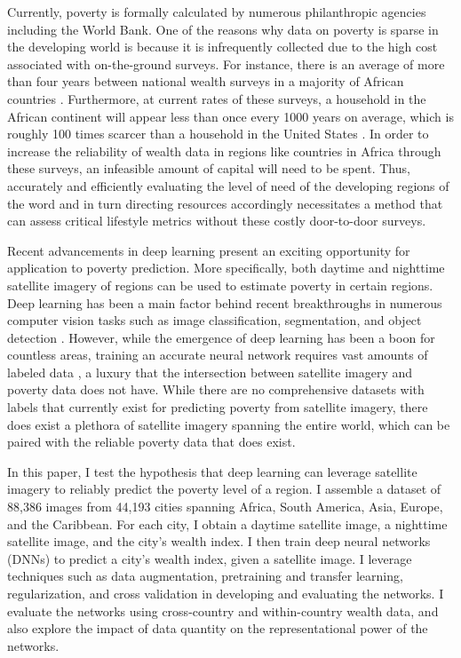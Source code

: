 \documentclass{article}
\begin{document}
Currently, poverty is formally calculated by numerous philanthropic agencies including the World Bank. One of the reasons why data on poverty is sparse in the developing world is because it is infrequently collected due to the high cost associated with on-the-ground surveys. For instance, there is an average of more than four years between national wealth surveys in a majority of African countries \cite{two}. Furthermore, at current rates of these surveys, a household in the African continent will appear less than once every 1000 years on average, which is roughly 100 times scarcer than a household in the United States \cite{three}. In order to increase the reliability of wealth data in regions like countries in Africa through these surveys, an infeasible amount of capital will need to be spent. Thus, accurately and efficiently evaluating the level of need of the developing regions of the word and in turn directing resources accordingly necessitates a method that can assess critical lifestyle metrics without these costly door-to-door surveys.

Recent advancements in deep learning present an exciting opportunity for application to poverty prediction. More specifically, both daytime and nighttime satellite imagery of regions can be used to estimate poverty in certain regions. \cite{three} Deep learning has been a main factor behind recent breakthroughs in numerous computer vision tasks such as image classification, segmentation, and object detection \cite{four, five, six, seven}. However, while the emergence of deep learning has been a boon for countless areas, training an accurate neural network requires vast amounts of labeled data \cite{eight, nine}, a luxury that the intersection between satellite imagery and poverty data does not have. While there are no comprehensive datasets with labels that currently exist for predicting poverty from satellite imagery, there does exist a plethora of satellite imagery spanning the entire world, which can be paired with the reliable poverty data that does exist.

In this paper, I test the hypothesis that deep learning can leverage satellite imagery to reliably predict the poverty level of a region. I assemble a dataset of 88,386 images from 44,193 cities spanning Africa, South America, Asia, Europe, and the Caribbean. For each city, I obtain a daytime satellite image, a nighttime satellite image, and the city’s wealth index. I then train deep neural networks (DNNs) to predict a city’s wealth index, given a satellite image. I leverage techniques such as data augmentation, pretraining and transfer learning, regularization, and cross validation in developing and evaluating the networks. I evaluate the networks using cross-country and within-country wealth data, and also explore the impact of data quantity on the representational power of the networks.
\end{document}
